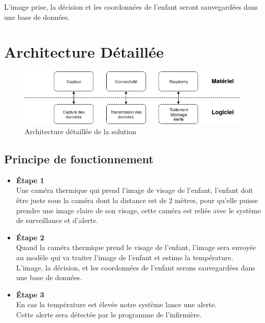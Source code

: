 \documentclass[12pt]{article}
\begin{document}
L'image prise, la décision et les coordonnées de l'enfant seront sauvegardées dans une base de données.
   \newpage
\section{Architecture Détaillée}

\begin{figure}[h]
	\centering
	\includegraphics[width=14cm]{img-Chapiter-3/architecturedetaillee.png}
	\caption{Architecture détaillée de la solution}
\end{figure}

\subsection{Principe de fonctionnement}
\begin{itemize}
	\item \textbf{Étape 1}\\
	Une caméra thermique qui prend l'image de visage de l'enfant, l'enfant doit être juste sous la caméra dont la distance est de 2 mètres, pour qu’elle puisse prendre une image claire de son visage, cette caméra est reliée avec le système de surveillance et d'alerte.
	\item \textbf{Étape 2}\\
	Quand la caméra thermique prend le visage de l'enfant, l'image sera envoyée  au modèle qui va traiter l'image de l’enfant et estime la température.\\
	L'image, la décision, et les coordonnées de l'enfant serons sauvegardées dans une base de données.
	\item \textbf{Étape 3}\\
	En cas la température est élevée notre système lance une alerte.\\
	Cette alerte sera détectée par le programme de l'infirmière. 
\end{itemize}
\end{document}
